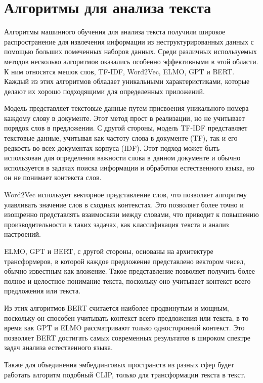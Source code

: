 \documentclass[PI, VKR]{HSEUniversity}
\begin{document}
\section{Алгоритмы для анализа текста}
\label{sec:org3f596cb}
Алгоритмы машинного обучения для анализа текста получили широкое распространение для извлечения информации из неструктурированных данных с помощью больших помеченных наборов данных. Среди различных используемых методов несколько алгоритмов оказались особенно эффективными в этой области. К ним относятся мешок слов\autocite{doi:10.1080/00437956.1954.11659520}, TF-IDF\autocite{jones1972statistical}, Word2Vec\autocite{mikolov2013distributed}, ELMO\autocite{elmo}, GPT\autocite{radford2019language} и BERT\autocite{devlin2018bert}. Каждый из этих алгоритмов обладает уникальными характеристиками, которые делают их хорошо подходящими для определенных приложений.

Модель \label{Мешок слов} представляет текстовые данные путем присвоения уникального номера каждому слову в документе. Этот метод прост в реализации, но не учитывает порядок слов в предложении. С другой стороны, модель TF-IDF представляет текстовые данные, учитывая как частоту слова в документе (TF), так и его редкость во всех документах корпуса (IDF). Этот подход может быть использован для определения важности слова в данном документе и обычно используется в задачах поиска информации и обработки естественного языка, но он не понимает контекста слов.

Word2Vec использует векторное представление слов, что позволяет алгоритму улавливать значение слов в сходных контекстах. Это позволяет более точно и изощренно представлять взаимосвязи между словами, что приводит к повышению производительности в таких задачах, как классификация текста и анализ настроений.

ELMO, GPT и BERT, с другой стороны, основаны на архитектуре трансформеров, в которой каждое предложение представлено вектором чисел, обычно известным как вложение. Такое представление позволяет получить более полное и целостное понимание текста, поскольку оно учитывает контекст всего предложения или текста.

Из этих алгоритмов BERT считается наиболее продвинутым и мощным, поскольку он способен учитывать контекст всего предложения или текста, в то время как GPT и ELMO рассматривают только односторонний контекст. Это позволяет BERT достигать самых современных результатов в широком спектре задач анализа естественного языка.

Также для объединения эмбеддинговых пространств из разных сфер будет работать алгоритм подобный CLIP\autocite{radford2021learning}, только для трансформации текста в текст.
\end{document}

